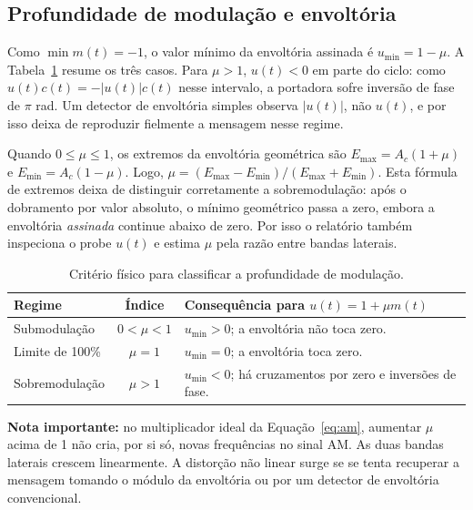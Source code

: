 \documentclass[11pt,a4paper]{article}
\begin{document}
\subsection{Profundidade de modulação e envoltória}
Como $\min m(t)=-1$, o valor mínimo da envoltória assinada é $u_{\min}=1-\mu$. A Tabela~\ref{tab:regimes} resume os três casos. Para $\mu>1$, $u(t)<0$ em parte do ciclo: como $u(t)c(t)=-|u(t)|c(t)$ nesse intervalo, a portadora sofre inversão de fase de $\pi$ rad. Um detector de envoltória simples observa $|u(t)|$, não $u(t)$, e por isso deixa de reproduzir fielmente a mensagem nesse regime.

Quando $0\leq\mu\leq1$, os extremos da envoltória geométrica são $E_{\max}=A_c(1+\mu)$ e $E_{\min}=A_c(1-\mu)$. Logo, $\mu=(E_{\max}-E_{\min})/(E_{\max}+E_{\min})$. Esta fórmula de extremos deixa de distinguir corretamente a sobremodulação: após o dobramento por valor absoluto, o mínimo geométrico passa a zero, embora a envoltória \emph{assinada} continue abaixo de zero. Por isso o relatório também inspeciona o probe $u(t)$ e estima $\mu$ pela razão entre bandas laterais.

\begin{table}[htbp]
\centering
\caption{Critério físico para classificar a profundidade de modulação.}
\label{tab:regimes}
\begin{tabularx}{\textwidth}{@{}l c X@{}}
\toprule
Regime & Índice & Consequência para $u(t)=1+\mu m(t)$\\
\midrule
Submodulação & $0<\mu<1$ & $u_{\min}>0$; a envoltória não toca zero.\\
Limite de 100\% & $\mu=1$ & $u_{\min}=0$; a envoltória toca zero.\\
Sobremodulação & $\mu>1$ & $u_{\min}<0$; há cruzamentos por zero e inversões de fase.\\
\bottomrule
\end{tabularx}
\end{table}

\textbf{Nota importante:} no multiplicador ideal da Equação~\eqref{eq:am}, aumentar $\mu$ acima de 1 não cria, por si só, novas frequências no sinal AM. As duas bandas laterais crescem linearmente. A distorção não linear surge se se tenta recuperar a mensagem tomando o módulo da envoltória ou por um detector de envoltória convencional.
\end{document}
